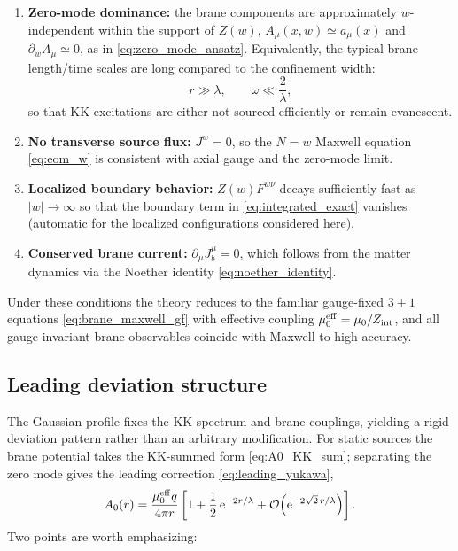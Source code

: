 \documentclass[11pt]{article}
\newcommand{\ee}{\mathrm e}
\newcommand{\A}{A}
\newcommand{\F}{F}
\newcommand{\J}{J}
\newcommand{\Z}{Z}
\newcommand{\lam}{\lambda}      %
\newcommand{\Zint}{Z_{\rm int}} %
\newcommand{\muo}{\mu_0}
\newcommand{\mueff}{\mu_0^{\rm eff}}
\begin{document}
\begin{enumerate}
\item \textbf{Zero-mode dominance:} the brane components are approximately
\(w\)-independent within the support of \(\Z(w)\),
\(\A_\mu(x,w)\simeq a_\mu(x)\) and \(\partial_w \A_\mu\simeq 0\), as in
\cref{eq:zero_mode_ansatz}. Equivalently, the typical brane length/time scales
are long compared to the confinement width:
\begin{equation}
  r \gg \lam,
  \qquad
  \omega \ll \frac{2}{\lam},
\end{equation}
so that KK excitations are either not sourced efficiently or remain evanescent.

\item \textbf{No transverse source flux:} \(\J^w=0\), so the \(N=w\) Maxwell
equation \cref{eq:eom_w} is consistent with axial gauge and the zero-mode limit.

\item \textbf{Localized boundary behavior:} \(\Z(w)\F^{w\nu}\) decays sufficiently
fast as \(|w|\to\infty\) so that the boundary term in \cref{eq:integrated_exact}
vanishes (automatic for the localized configurations considered here).

\item \textbf{Conserved brane current:} \(\partial_\mu \J_b^\mu=0\), which follows
from the matter dynamics via the Noether identity \cref{eq:noether_identity}.
\end{enumerate}

Under these conditions the theory reduces to the familiar gauge-fixed \(3+1\)
equations \cref{eq:brane_maxwell_gf} with effective coupling
\(\mueff=\muo/\Zint\), and all gauge-invariant brane observables coincide with
Maxwell to high accuracy.

\subsection{Leading deviation structure}
The Gaussian profile fixes the KK spectrum and brane couplings, yielding a rigid
deviation pattern rather than an arbitrary modification. For static sources the
brane potential takes the KK-summed form \cref{eq:A0_KK_sum}; separating the zero
mode gives the leading correction \cref{eq:leading_yukawa},
\begin{equation}
  A_0(r)=\frac{\mueff q}{4\pi r}
  \left[1+\frac12\,\ee^{-2r/\lam}
  +\mathcal O\!\left(\ee^{-2\sqrt2\,r/\lam}\right)\right].
\end{equation}
Two points are worth emphasizing:
\end{document}
